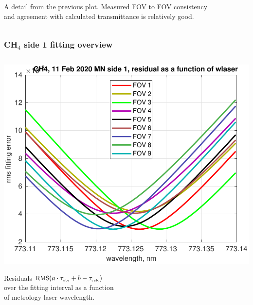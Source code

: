 \documentclass[9pt]{beamer}
\begin{document}
\begin{frame}
\begin{columns}[t]
\begin{column}{0.5\textwidth}
A detail from the previous plot.  Measured FOV to FOV consistency \\
and agreement with calculated transmittance is relatively good.

\end{column}
\end{columns}
\end{frame}
\begin{frame}
\frametitle{CH$_4$ side 1 fitting overview}
\begin{columns}[t]
\begin{column}{0.5\textwidth}
  \begin{centering}
  \includegraphics[width=\textwidth]{02-11_mn_s1_CH4/CH4_wlaser_fit.pdf}
  \end{centering}\vspace{3mm}

Residuals $\mbox{\small RMS}(a\cdot\tau_{\mbox{\tiny obs}} + b - \tau_{\mbox{\tiny calc}})$ \\ over the fitting
interval as a function \\ of metrology laser wavelength.


\end{column}
\end{columns}
\end{frame}
\end{document}
